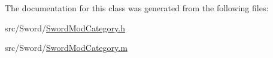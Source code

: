 The documentation for this class was generated from the following files\-:\begin{DoxyCompactItemize}
\item 
src/\-Sword/\hyperlink{_sword_mod_category_8h}{Sword\-Mod\-Category.\-h}\item 
src/\-Sword/\hyperlink{_sword_mod_category_8m}{Sword\-Mod\-Category.\-m}\end{DoxyCompactItemize}
